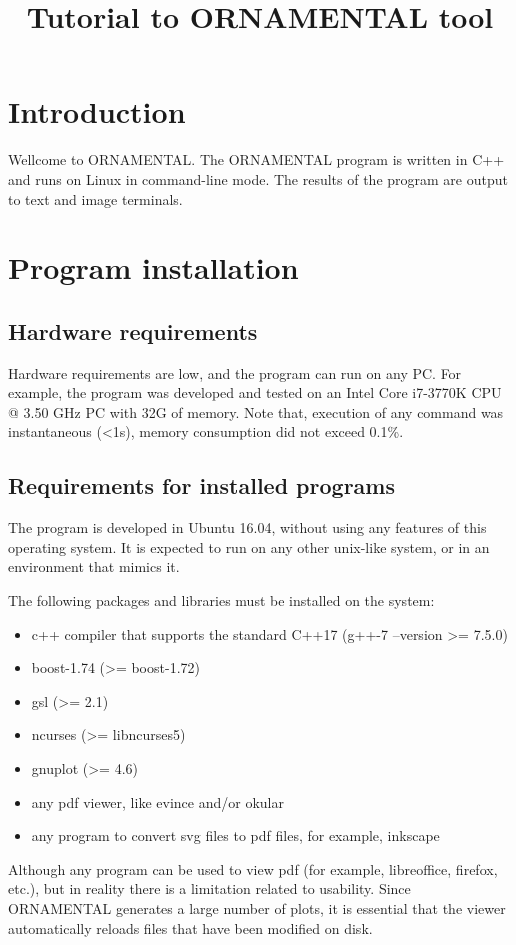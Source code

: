 \documentclass[a4paper]{article}
\begin{document}
\title{Tutorial to ORNAMENTAL tool}

\date{}
\maketitle

\section{Introduction}
Wellcome to ORNAMENTAL. The ORNAMENTAL program is written in C++ and runs on Linux in command-line mode. The results of the program are output to text and image terminals.

\section{Program installation}

\subsection{Hardware requirements}
Hardware requirements are low, and the program can run on any PC. For example, the program was developed and tested on an Intel Core i7-3770K CPU @ 3.50 GHz PC with 32G of memory. Note that, execution of any command was instantaneous (<1s), memory consumption did not exceed 0.1\%.

\subsection{Requirements for installed programs}
The program is developed in Ubuntu 16.04, without using any features of this operating system. It is expected to run on any other unix-like system, or in an environment that mimics it.

The following packages and libraries must be installed on the system:
\begin{itemize}
\item c++ compiler that supports the standard C++17 (g++-7 --version >= 7.5.0)
\item boost-1.74 (>= boost-1.72)
\item gsl (>= 2.1)
\item ncurses (>= libncurses5)
\item gnuplot (>= 4.6)
\item any pdf viewer, like evince and/or okular
\item any program to convert svg files to pdf files, for example, inkscape
\end{itemize}
Although any program can be used to view pdf (for example, libreoffice, firefox, etc.), but in reality there is a limitation related to usability. Since ORNAMENTAL generates a large number of plots, it is essential that the viewer automatically reloads files that have been modified on disk.
\end{document}
